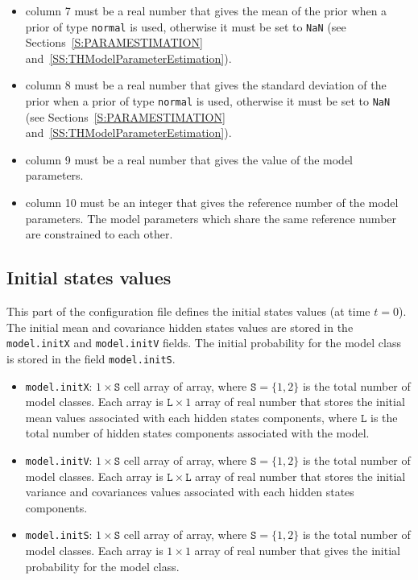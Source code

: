 \begin{itemize}
\item column 7 must be a real number that gives the mean of the prior when a prior of type \lstinline[basicstyle = \mlttfamily \small ]!normal! is used, otherwise it must be set to \lstinline[basicstyle = \mlttfamily \small ]!NaN! (see Sections~\ref{S:PARAMESTIMATION} and~\ref{SS:THModelParameterEstimation}).
\item column 8 must be a real number that gives the standard deviation of the prior when a prior of type \lstinline[basicstyle = \mlttfamily \small ]!normal! is used, otherwise it must be set to \lstinline[basicstyle = \mlttfamily \small ]!NaN! (see Sections~\ref{S:PARAMESTIMATION} and~\ref{SS:THModelParameterEstimation}).
\item column 9 must be a real number that gives the value of the model parameters.
\item column 10 must be an integer that gives the reference number of the model parameters. The model parameters which share the same reference number are constrained to each other.
\end{itemize}

\subsection{Initial states values}
\label{SS:InitialHS}
This part of the configuration file defines the initial states values (at time $t=0$).
The initial mean and covariance hidden states values are stored in the \lstinline[basicstyle = \mlttfamily \small ]!model.initX! and \lstinline[basicstyle = \mlttfamily \small ]!model.initV! fields.
The initial probability for the model class is stored in the field \lstinline[basicstyle = \mlttfamily \small ]!model.initS!.

\begin{itemize}
\item \lstinline[basicstyle = \mlttfamily \small ]!model.initX!: $1\times \mathtt{S}$ cell array of array, where $\mathtt{S} = \{1, 2 \}$ is the total number of model classes.
Each array is $\mathtt{L}\times1$ array of real number that stores the initial mean values associated with each hidden states components, where $\mathtt{L}$ is the total number of hidden states components associated with the model.
\item \lstinline[basicstyle = \mlttfamily \small ]!model.initV!: $1\times \mathtt{S}$ cell array of array, where $\mathtt{S} = \{1, 2 \}$ is the total number of model classes.
Each array is $\mathtt{L}\times\mathtt{L}$ array of real number that stores the initial variance and covariances values associated with each hidden states components.
\item \lstinline[basicstyle = \mlttfamily \small ]!model.initS!: $1\times \mathtt{S}$ cell array of array, where $\mathtt{S} = \{1, 2 \}$ is the total number of model classes. 
Each array is $1\times1$ array of real number that gives the initial probability for the model class.
\end{itemize}

